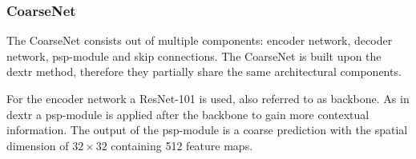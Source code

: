 \subsubsection{CoarseNet}
The CoarseNet consists out of multiple components: encoder network, decoder network, \gls{psp}-module and skip connections. The CoarseNet is built upon the \gls{dextr} method, therefore they partially share the same architectural components. 

For the encoder network a ResNet-101 \cite{He16-ResNet} is used, also referred to as backbone.
As in \gls{dextr} a \gls{psp}-module is applied after the backbone to gain more contextual information.
The output of the \gls{psp}-module is a coarse prediction with the spatial dimension of  $32 \times 32$  containing 512 feature maps. 

